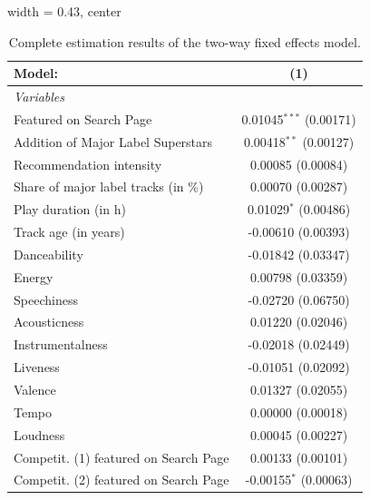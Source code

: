 
\begin{table}[htbp]
   \centering
   \begin{adjustbox}{width = 0.43\textwidth, center}
      \begin{threeparttable}[b]
         \caption{\label{tab:2wfe} Complete estimation results of the two-way fixed effects model.}
         \begin{tabular}{lc}
            \tabularnewline \midrule \midrule
            Model:                                 & (1)\\  
            \midrule
            \emph{Variables}\\
            Featured on Search Page                & 0.01045$^{***}$ (0.00171)\\   
            Addition of Major Label Superstars     & 0.00418$^{**}$ (0.00127)\\   
            Recommendation intensity               & 0.00085 (0.00084)\\   
            Share of major label tracks (in \%)    & 0.00070 (0.00287)\\   
            Play duration (in h)                   & 0.01029$^{*}$ (0.00486)\\   
            Track age (in years)                   & -0.00610 (0.00393)\\   
            Danceability                           & -0.01842 (0.03347)\\   
            Energy                                 & 0.00798 (0.03359)\\   
            Speechiness                            & -0.02720 (0.06750)\\   
            Acousticness                           & 0.01220 (0.02046)\\   
            Instrumentalness                       & -0.02018 (0.02449)\\   
            Liveness                               & -0.01051 (0.02092)\\   
            Valence                                & 0.01327 (0.02055)\\   
            Tempo                                  & 0.00000 (0.00018)\\   
            Loudness                               & 0.00045 (0.00227)\\   
            Competit. (1) featured on Search Page  & 0.00133 (0.00101)\\   
            Competit. (2) featured on Search Page  & -0.00155$^{*}$ (0.00063)\\   

\end{tabular}
\end{threeparttable}
\end{adjustbox}
\end{table}
